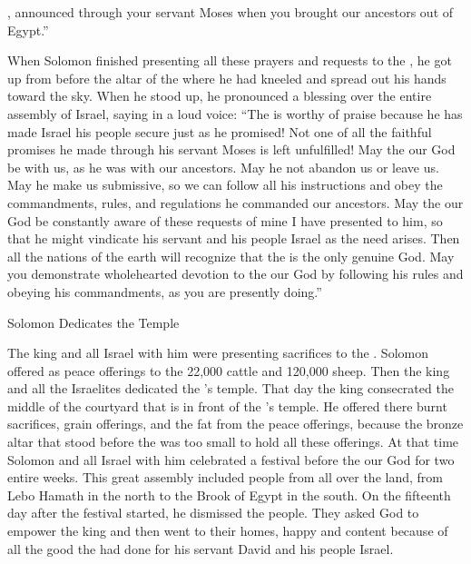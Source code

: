 {{}, announced
through
your servant
Moses
when you brought
our ancestors
out of Egypt.”
\par }{\PP {}When
Solomon
finished
presenting
all
these
prayers
and requests
to
the {}, he got
up from before
the altar
of the {}
where
he had kneeled
and spread
out his hands
toward the sky.
When he stood
up, he pronounced a blessing
over the entire
assembly
of Israel,
saying
in a loud
voice:
“The
{}
is worthy
of praise because he has
made
Israel
his people
secure
just
as he promised! Not
one
of all
the faithful promises
he made through
his servant
Moses
is left unfulfilled!
May
the {}
our God
be with
us, as
he was with
our ancestors.
May
he not
abandon
us or
leave us.
May he make us
submissive,
so we can follow
all
his instructions
and obey
the commandments,
rules,
and regulations
he commanded
our ancestors.
May
the {}
our God be constantly
aware
of these
requests
of mine I have presented
to
him, so that he might vindicate
his servant
and his people
Israel
as the need
arises.
Then
all
the nations
of the earth
will recognize
that
the {}
is
the only genuine
God.
May
you demonstrate
wholehearted
devotion
to the
{}
our God
by following
his rules
and obeying
his commandments,
as you are presently doing.”
\par }{\SH Solomon Dedicates the Temple
\par }{\PP {}The king
and all
Israel
with
him were presenting sacrifices
to the
{}.
Solomon
offered
as peace offerings
to the
{}
22,000
cattle
and 120,000
sheep.
Then the king
and all
the Israelites
dedicated
the
{}’s
temple.
That day
the king
consecrated
the
middle
of the courtyard
that
is in front
of the
{}’s
temple.
He
offered there
burnt sacrifices,
grain offerings,
and the fat
from the peace offerings,
because
the bronze
altar
that
stood before
the {}
was too small
to hold
all these
offerings.
At that time
Solomon
and
all
Israel
with
him celebrated
a festival
before
the {}
our God
for two
entire weeks.
This great
assembly
included people from all over the land, from Lebo Hamath
in the north to the Brook
of Egypt in the south.
On
the fifteenth day
after the festival
started, he dismissed
the
people.
They asked God to empower
the
king
and then went
to their homes,
happy
and content
because of all
the good
the {}
had
done
for his servant
David
and his people
Israel.


}
